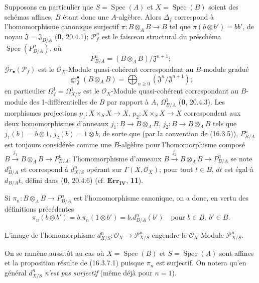 \begin{env}[16.3.7]
\label{IV.16.3.7}
Supposons en particulier que $S=\operatorname{Spec}(A)$ et
$X=\operatorname{Spec}(B)$ soient des schémas affines, $B$ étant donc une
$A$-algèbre. Alors $\Delta_f$ correspond à l'homomorphisme canonique surjectif
$\pi:B\otimes_A B\to B$ tel que $\pi(b\otimes b')=bb'$, de noyau
$\mathfrak{J}=\mathfrak{J}_{B/A}$ (\textbf{0}, 20.4.1); $\mathscr{P}_f^n$ est le faisceau
structural du préschéma $\operatorname{Spec}(P_{B/A}^n)$, où
\[
  P_{B/A}^n=(B\otimes_A B)/\mathfrak{J}^{n+1};
\]
$\mathscr{G}r_\bullet(\mathscr{P}_f)$ est le $\mathcal{O}_X$-Module
quasi-cohérent correspondant au $B$-module gradué
\[
  \operatorname{gr}_{\mathfrak{J}}^\bullet(B\otimes_A B)
  =\bigoplus_{n\geq 0}(\mathfrak{J}^n/\mathfrak{J}^{n+1});
\]
en particulier $\varOmega_f^1=\varOmega_{X/S}^1$ est le $\mathcal{O}_X$-Module
quasi-cohérent correspondant au $B$-module des 1-différentielles de $B$ par
rapport à $A$, $\Omega_{B/A}^1$ (\textbf{0}, 20.4.3). Les morphismes projections
$p_1:X\times_S X\to X$, $p_2:X\times_S X\to X$ correspondent aux deux
homomorphismes d'anneaux $j_1:B\to B\otimes_A B$, $j_2:B\to B\otimes_A B$
tels que $j_1(b)=b\otimes 1$, $j_2(b)=1\otimes b$, de sorte que (par la
convention de (16.3.5)), $P_{B/A}^n$ est toujours considérée comme une
$B$-algèbre pour l'homomorphisme composé
$B\xrightarrow{j_1}B\otimes_A B\to P_{B/A}^n$; l'homomorphisme d'anneaux
$B\xrightarrow{j_2}B\otimes_A B\to P_{B/A}^n$ se note $d_{B/A}^n$ et correspond
à $d_{X/S}^n$ opérant sur $\Gamma(X,\mathcal{O}_X)$; pour tout $t\in B$, $dt$
est égal à $d_{B/A}t$, défini dans (\textbf{0}, 20.4.6) (cf. $\mathbf{Err}_{\mathbf{IV}}$,
\textbf{11}).

Si $\pi_n:B\otimes_A B\to P_{B/A}^n$ est l'homomorphisme canonique, on a donc,
en vertu des définitions précédentes
\[
  \pi_n(b\otimes b')=b.\pi_n(1\otimes b')=b.d_{B/A}^n(b')
  \quad\text{pour }b\in B,\ b'\in B.
  \tag{16.3.7.1}
  \label{IV.16.3.7.1}
\]
\end{env}

\begin{proposition}[16.3.8]
\label{IV.16.3.8}
L'image de l'homomorphisme $d_{X/S}^n:\mathcal{O}_X\to\mathscr{P}_{X/S}^n$
engendre le $\mathcal{O}_X$-Module $\mathscr{P}_{X/S}^n$.
\end{proposition}

On se ramène aussitôt au cas où $X=\operatorname{Spec}(B)$ et
$S=\operatorname{Spec}(A)$ sont affines et la proposition résulte de (16.3.7.1)
puisque $\pi_n$ est surjectif. On notera qu'en général $d_{X/S}^n$ \emph{n'est pas
surjectif} (même déjà pour $n=1$).

